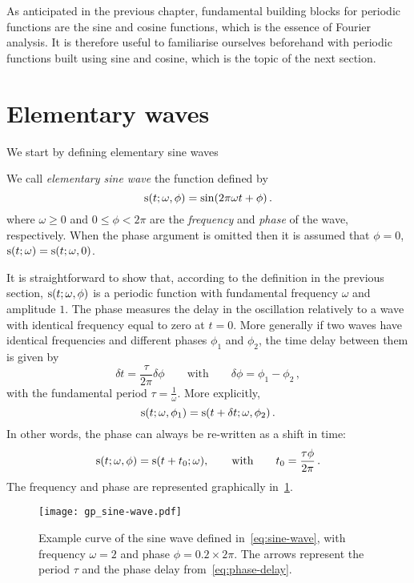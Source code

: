 As anticipated in the previous chapter, fundamental building blocks for periodic functions
are the sine and cosine functions, which is the essence of Fourier analysis. It is
therefore useful to familiarise ourselves beforehand with periodic functions built using
sine and cosine, which is the topic of the next section.
\section{Elementary waves}
We start by defining elementary sine waves
\begin{definition}
  \label{def:sine-wave}
  We call \emph{elementary sine wave} the function defined by
  \begin{equation}
    \operatorname{s}(t;\omega,\phi)=\sin(2\pi\omega t + \phi)\,.\label{eq:sine-wave}
  \end{equation}
  where $\omega\geq 0$ and $0\leq\phi<2\pi$ are the \emph{frequency} and \emph{phase} of
  the wave, respectively. When the phase argument is omitted then it is assumed that
  $\phi=0$, \ie $\operatorname{s}(t;\omega)=\operatorname{s}(t;\omega,0)$.
\end{definition}
\noindent It is straightforward to show that, according to the definition in the previous
section, $\operatorname{s}(t;\omega,\phi)$ is a periodic function with fundamental frequency $\omega$
and amplitude $1$. The phase measures the delay in the oscillation relatively to a wave
with identical frequency equal to zero at $t=0$. More generally if two waves have
identical frequencies and different phases $\phi_1$ and $\phi_2$, the time delay between
them is given by
\begin{equation}
  \delta t =\frac{\tau}{2\pi}\delta\phi\qquad\text{with}\qquad\delta\phi=\phi_1-\phi_2\,,
\end{equation}
with the fundamental period $\tau=\frac{1}{\omega}$. More explicitly,
\begin{equation}
  \operatorname{s}(t;\omega,\phi_1)=\operatorname{s}(t+\delta t;\omega,\phi_2)\,.
\end{equation}
In other words, the phase can always be re-written as a shift in time:
\begin{equation}
  \operatorname{s}(t;\omega,\phi)=\operatorname{s}(t+t_0;\omega),
  \qquad\text{with}\qquad
  t_0 = \frac{\tau\phi}{2\pi}\,.\label{eq:phase-delay}
\end{equation}
The frequency and phase are represented graphically in~\cref{fig:sine-wave}.
\begin{figure}[t]
  \centering
  \texttt{[image: gp\_sine-wave.pdf]}
  \caption{Example curve of the sine wave defined in~\cref{eq:sine-wave}, with frequency
    $\omega=2$ and phase $\phi=0.2\times 2\pi$. The arrows represent the period
  $\tau$ and the phase delay from~\cref{eq:phase-delay}.}
  \label{fig:sine-wave}
\end{figure}
